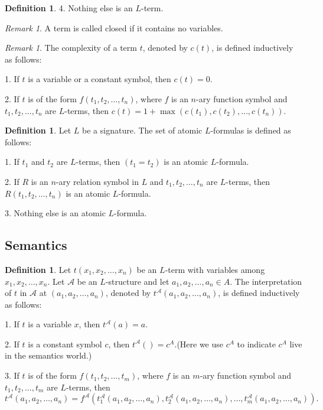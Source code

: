 \documentclass[12pt, reqno]{amsart}
\theoremstyle{definition}
\newtheorem{definition}[theorem]{Definition}
\theoremstyle{remark}
\newtheorem{remark}[theorem]{Remark}
\numberwithin{equation}{section}
\begin{document}
{\begin{definition}
    4. Nothing else is an $L$-term.
\end{definition}

\begin{remark}
    A term is called closed if it contains no variables.
\end{remark}

\begin{remark}
    The complexity of a term $t$, denoted by $c(t)$, is defined inductively as follows:
    
    1. If $t$ is a variable or a constant symbol, then $c(t) = 0$.

    2. If $t$ is of the form $f(t_1, t_2, \ldots, t_n)$, where $f$ is an $n$-ary function symbol and $t_1, t_2, \ldots, t_n$ are $L$-terms, then $c(t) = 1 + \max(c(t_1), c(t_2), \ldots, c(t_n))$.
\end{remark}

\begin{definition}
    Let $L$ be a signature. The set of atomic $L$-formulas is defined as follows:

    1. If $t_1$ and $t_2$ are $L$-terms, then $(t_1 = t_2)$ is an atomic $L$-formula.

    2. If $R$ is an $n$-ary relation symbol in $L$ and $t_1, t_2, \ldots, t_n$ are $L$-terms, then $R(t_1, t_2, \ldots, t_n)$ is an atomic $L$-formula.

    3. Nothing else is an atomic $L$-formula.
\end{definition}

\subsection{Semantics}

\begin{definition}
    Let $t(x_1, x_2, \ldots, x_n)$ be an $L$-term with variables among $x_1, x_2, \ldots, x_n$. Let $\mathcal{A}$ be an $L$-structure and let $a_1, a_2, \ldots, a_n\in A$. The interpretation of $t$ in $\mathcal{A}$ at $(a_1, a_2, \ldots, a_n)$, denoted by $t^{\mathcal{A}}(a_1, a_2, \ldots, a_n)$, is defined inductively as follows:

    1. If $t$ is a variable $x$, then $t^{\mathcal{A}}(a) = a$.

    2. If $t$ is a constant symbol $c$, then $t^{\mathcal{A}}() = c^A$.(Here we use $c^A$ to indicate $c^A$ live in the semantics world.)

    3. If $t$ is of the form $f(t_1, t_2, \ldots, t_m)$, where $f$ is an $m$-ary function symbol and $t_1, t_2, \ldots, t_m$ are $L$-terms, then
    \[
        t^{\mathcal{A}}(a_1, a_2, \ldots, a_n) = f^{\mathcal{A}}(t_1^{\mathcal{A}}(a_1, a_2, \ldots, a_n), t_2^{\mathcal{A}}(a_1, a_2, \ldots, a_n), \ldots, t_m^{\mathcal{A}}(a_1, a_2, \ldots, a_n)).
    \]
    

\end{definition}}
\end{document}
